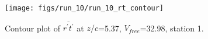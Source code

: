\begin{figure}[H]
\centering
\texttt{[image: figs/run\_10/run\_10\_rt\_contour]}
\caption{Contour plot of $\overline{r^\prime t^\prime}$ at $z/c$=5.37, $V_{free}$=32.98, station 1.}
\label{fig:run_10_rt_contour}
\end{figure}


